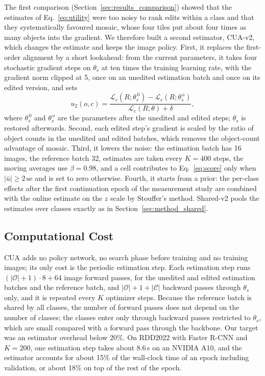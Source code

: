 \documentclass[conference]{IEEEtran}
\begin{document}
The first comparison (Section~\ref{sec:results_comparison}) showed that the estimates of Eq.~\eqref{eq:utility} were too noisy to rank edits within a class and that they systematically favoured mosaic, whose four tiles put about four times as many objects into the gradient. We therefore built a second estimator, CUA-v2, which changes the estimate and keeps the image policy. First, it replaces the first-order alignment by a short lookahead: from the current parameters, it takes four stochastic gradient steps on $\theta_s$ at ten times the training learning rate, with the gradient norm clipped at 5, once on an unedited estimation batch and once on its edited version, and sets
\begin{equation}
u_2(o,c)=\frac{\mathcal{L}_c(R;\theta_s^{\,0})-\mathcal{L}_c(R;\theta_s^{\,o})}{\mathcal{L}_c(R;\theta)+\delta},
\label{eq:utility_v2}
\end{equation}
where $\theta_s^{\,0}$ and $\theta_s^{\,o}$ are the parameters after the unedited and edited steps; $\theta_s$ is restored afterwards. Second, each edited step's gradient is scaled by the ratio of object counts in the unedited and edited batches, which removes the object-count advantage of mosaic. Third, it lowers the noise: the estimation batch has 16 images, the reference batch 32, estimates are taken every $K=400$ steps, the moving averages use $\beta=0.98$, and a cell contributes to Eq.~\eqref{eq:score} only when $|\bar u|\geq 2\,\mathrm{se}$ and is set to zero otherwise. Fourth, it starts from a prior: the per-class effects after the first continuation epoch of the measurement study are combined with the online estimate on the $z$ scale by Stouffer's method. Shared-v2 pools the estimates over classes exactly as in Section~\ref{sec:method_shared}.

\subsection{Computational Cost}
\label{sec:method_cost}

CUA adds no policy network, no search phase before training and no training images; its only cost is the periodic estimation step. Each estimation step runs $(|\mathcal{O}|+1)\cdot 8+64$ image forward passes, for the unedited and edited estimation batches and the reference batch, and $|\mathcal{O}|+1+|\mathcal{C}|$ backward passes through $\theta_s$ only, and it is repeated every $K$ optimizer steps. Because the reference batch is shared by all classes, the number of forward passes does not depend on the number of classes; the classes enter only through backward passes restricted to $\theta_s$, which are small compared with a forward pass through the backbone. Our target was an estimator overhead below 20\%. On RDD2022 with Faster R-CNN and $K=200$, one estimation step takes about 8.6\,s on an NVIDIA A10, and the estimator accounts for about 15\% of the wall-clock time of an epoch including validation, or about 18\% on top of the rest of the epoch.
\end{document}
